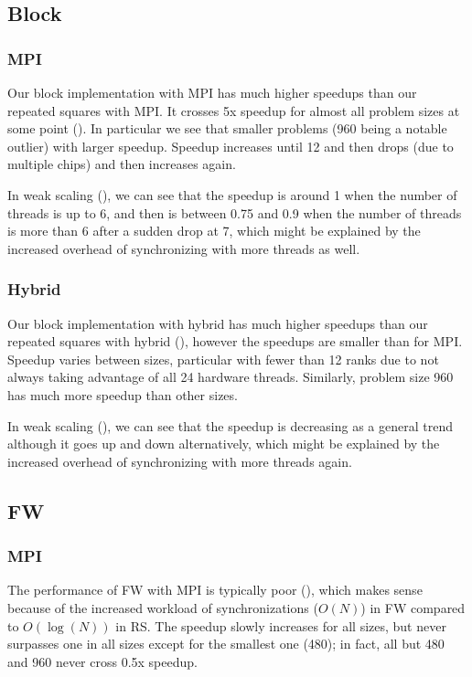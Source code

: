 \subsection{Block}
\subsubsection{MPI}
Our block implementation with MPI has much higher speedups than our repeated
squares with MPI. It crosses 5x speedup for almost all problem sizes at some
point (). In particular we see that smaller
problems (960 being a notable outlier) with larger speedup. Speedup increases 
until 12 and then drops (due to multiple chips) and then increases again.

In weak scaling (), we can see that the speedup is around 1
when the number of threads is up to 6, and then is between 0.75 and 0.9  
when the number of threads is more than 6 after a sudden drop at 7, which might be 
explained by the increased overhead of synchronizing with more threads as well.

\subsubsection{Hybrid}
Our block implementation with hybrid has much higher speedups than our repeated
squares with hybrid (), however the speedups are smaller than for MPI. 
Speedup varies between sizes, particular
with fewer than 12 ranks due to not always taking advantage of all 24 hardware
threads. Similarly, problem size 960 has much more speedup than other sizes.

In weak scaling (), we can see that the speedup is decreasing as a general trend
although it goes up and down alternatively, which might be explained by the increased overhead of 
synchronizing with more threads again.

\subsection{FW}
\subsubsection{MPI}
The performance of FW with MPI is typically poor (), 
which makes sense because of the increased workload of synchronizations ($O(N)$) in FW
compared to $O(\log(N))$ in RS. The speedup slowly increases for all sizes,
but never surpasses one in all sizes except for the smallest one (480); in
fact, all but 480 and 960 never cross 0.5x speedup.

